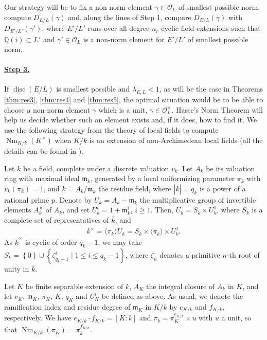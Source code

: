 \documentclass[smallextended]{svjour3}
\newcommand{\Q}{\mathbb{Q}}
\newcommand{\Or}{\mathcal{O}}
\DeclareMathOperator{\Nm}{Nm}
\DeclareMathOperator{\disc}{disc}
\begin{document}
Our strategy will be to fix a non-norm element $\gamma \in \Or_L$ of smallest possible norm, compute  $D_{E/L}(\gamma)$ and, along the lines of Step 1, compare $D_{E/L}(\gamma)$ with $D_{E'/L'}(\gamma')$, where $E'/L'$ runs over all degree-$n_r$ cyclic field extensions such that $\Q(i)\subset L'$ and $\gamma' \in \Or_L$ is a non-norm element for $E'/L'$ of smallest possible norm.
  
  
\paragraph{\underline{Step 3.}}
If $\disc (E/L)$ is smallest possible and $\lambda_{E,L} < 1$, as will be the case in Theorems \ref{thm:res3}, \ref{thm:res4} and \ref{thm:res5}, the optimal situation would be to be able to choose a non-norm element $\gamma$ which is a unit, $\gamma \in \Or_L^{\times}$. Hasse's Norm Theorem
will help us decide whether such an element exists and, if it does, how to find it. We use the following strategy from the theory of local fields to compute $\Nm_{K/k}(K^{\times})$ when $K/k$ is an extension of non-Archimedean local fields (all the details can be found in \cite[Chp.~7]{JM}).

Let $k$ be a field, complete under a discrete valuation $v_k$. Let $A_k$ be its valuation ring with maximal ideal $\mathfrak m_k$, generated by a local uniformizing parameter $\pi_k$ with $v_k(\pi_k)=1$, and $\overline{k} = A_k/\mathfrak m_k$ the residue field, where $|\overline k| = q_k$ is a power of a rational prime $p$. Denote by $U_k = A_k-\mathfrak m_k$ the multiplicative group of invertible elements $A_k^{\times}$ of $A_k$, and set $U_k^i = 1+\mathfrak m_k^i$, $i\ge 1$.
Then, $U_k = S_k\times U_k^1$, where $S_{k}$ is a complete set of representatives of $\overline k$, and  
\begin{align*}
	k^{\times} = \langle \pi_k\rangle U_k = S_k \times \langle \pi_k \rangle \times U_k^1.
\end{align*}  
As $\overline k^{\times}$ is cyclic of order $q_k-1$, we may take $S_k =\left\{0\right\} \cup \left\{\zeta_{q_k-1}^i \mid 1 \le i \le q_k-1\right\} $, where $ \zeta_n$ denotes a primitive $n$-th root of unity in $\overline k$.
 
Let $K$ be finite separable extension of $k$, $A_K$ the integral closure of $A_k$ in $K$, and let $v_K$, $\mathfrak m_K$, $\pi_K$, $\overline K$, $q_K$ and $U_K^i$ be defined as above. As usual, we denote the ramification index and residue degree of $\mathfrak m_K$ in $K/k$ by $e_{K/k}$ and $f_{K/k}$, respectively. We have $e_{K/k}\cdot f_{K/k} = [K:k]$ and $\pi_k = \pi_K^{e_{K/k}}\times u$ with $u$ a unit, so that $\Nm_{K/k}(\pi_K) = \pi_k^{f_{K/k}}$.
\end{document}
